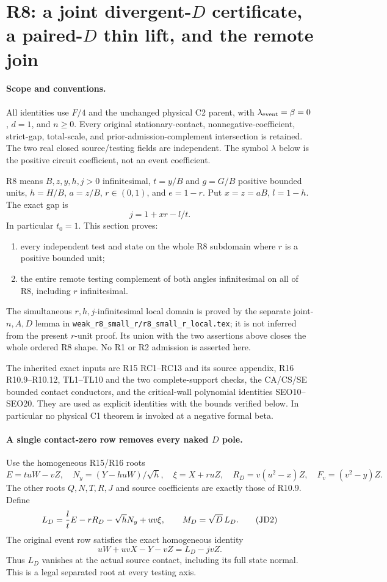 \section{R8: a joint divergent-$D$ certificate, a paired-$D$ thin lift, and the remote join}
\label{sec:r17-R8-joint-D}

\paragraph{Scope and conventions.}
All identities use $F/4$ and the unchanged physical C2 parent, with
$\lambda_{\rm event}=\beta=0$, $d=1$, and $n\ge0$.  Every original
stationary-contact, nonnegative-coefficient, strict-gap, total-scale,
and prior-admission-complement intersection is retained.  The two real
closed source/testing fields are independent.  The symbol $\lambda$
below is the positive circuit coefficient, not an event coefficient.

R8 means $B,z,y,h,j>0$ infinitesimal, $t=y/B$ and $g=G/B$ positive
bounded units, $h=H/B$, $a=z/B$, $r\in(0,1)$, and $e=1-r$.  Put
$x=z=aB$, $l=1-h$.  The exact gap is
\[
                 j=1+xr-l/t.                         \tag{JD1}
\]
In particular $t_0=1$.  This section proves:
\begin{enumerate}
\item every independent test and state on the whole R8 subdomain
      where $r$ is a positive bounded unit;
\item the entire remote testing complement of both angles
      infinitesimal on all of R8, including $r$ infinitesimal.
\end{enumerate}
The simultaneous $r,h,j$-infinitesimal local domain is proved by the
separate joint-$n,A,D$ lemma in
\texttt{weak\_r8\_small\_r/r8\_small\_r\_local.tex}; it is not
inferred from the present $r$-unit proof.  Its union with the two
assertions above closes the whole ordered R8 shape.  No R1 or R2
admission is asserted here.

The inherited exact inputs are R15 RC1--RC13 and its source appendix,
R16 R10.9--R10.12, TL1--TL10 and the two complete-support checks, the
CA/CS/SE bounded contact conductors, and the critical-wall polynomial
identities SEO10--SEO20.  They are used as explicit identities with
the bounds verified below.  In particular no physical C1 theorem is
invoked at a negative formal beta.

\paragraph{A single contact-zero row removes every naked $D$ pole.}
Use the homogeneous R15/R16 roots
\[
 E=tuW-vZ,\quad N_y=(Y-huW)/\sqrt h,\quad \xi=X+ruZ,
 \quad R_D=v(u^2-x)Z,\quad F_v=(v^2-y)Z.
\]
The other roots $Q,N,T,R,J$ and source coefficients are exactly those
of R10.9.  Define
\[
 L_D={l\over t}E-rR_D-\sqrt hN_y+uv\xi,
 \qquad M_D=\sqrt D\,L_D.                            \tag{JD2}
\]
The original event row satisfies the exact homogeneous identity
\[
 uW+uvX-Y-vZ=L_D-jvZ.                               \tag{JD3}
\]
Thus $L_D$ vanishes at the actual source contact, including its full
state normal.  This is a legal separated root at every testing axis.

